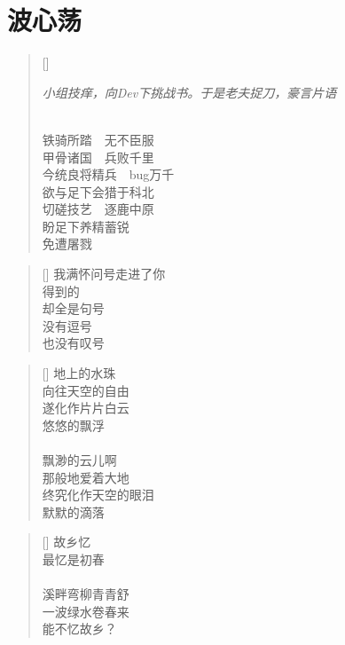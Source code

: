 \chapter{波心荡}
\thispagestyle{empty}

\renewcommand{\poemtoc}{section}
\settowidth{\versewidth}{秋高气爽 QA射雕}
\begin{verse}[\versewidth]

\centerline{\emph{\scriptsize{小组技痒，向Dev下挑战书。于是老夫捉刀，豪言片语}}}

\\
铁骑所踏\ \ 无不臣服\\
甲骨诸国\ \ 兵败千里\\
今统良将精兵\ \ bug万千\\
欲与足下会猎于科北\\
切磋技艺\ \ 逐鹿中原\\
盼足下养精蓄锐\\
免遭屠戮 
\end{verse}

\renewcommand{\poemtoc}{section}
\settowidth{\versewidth}{秋高气爽 QA射雕}
\begin{verse}[\versewidth]
我满怀问号走进了你\\
得到的\\
却全是句号\\
没有逗号\\
也没有叹号\\
\end{verse}


\renewcommand{\poemtoc}{section}
\settowidth{\versewidth}{秋高气爽 QA射雕}
\begin{verse}[\versewidth]
地上的水珠\\
向往天空的自由\\
遂化作片片白云\\
悠悠的飘浮\\
~\\
飘渺的云儿啊\\
那般地爱着大地\\
终究化作天空的眼泪\\
默默的滴落
\end{verse}
\newpage

\renewcommand{\poemtoc}{section}
\settowidth{\versewidth}{风仍劲, 雪正紧}
\begin{verse}[\versewidth]
故乡忆\\
最忆是初春\\
~\\
溪畔弯柳青青舒\\
一波绿水卷春来\\
能不忆故乡？
\end{verse}


